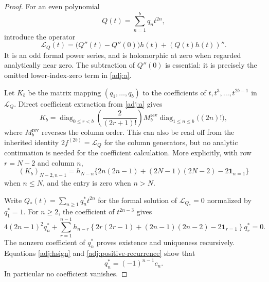 \documentclass[11pt,a4paper]{article}
\numberwithin{equation}{section}
\theoremstyle{definition}
\theoremstyle{remark}
\begin{document}
\begin{proof}
For an even polynomial
\[
 Q(t)=\sum_{n=1}^{b}q_n t^{2n},
\]
introduce the operator
\begin{equation}\label{adj:operator}
 \mathcal L_Q(t)=\bigl(Q''(t)-Q''(0)\bigr)h(t)+(Q(t)h(t))''.
\end{equation}
It is an odd formal power series, and is holomorphic at zero when
regarded analytically near zero.  The subtraction of $Q''(0)$ is
essential: it is precisely the omitted lower-index-zero term in
\eqref{adj:a}.

Let $K_b$ be the matrix mapping $(q_1,\ldots,q_b)$ to the
coefficients of $t,t^3,\ldots,t^{2b-1}$ in $\mathcal L_Q$.
Direct coefficient extraction from \eqref{adj:a} gives
\begin{equation}\label{adj:matrix-conjugacy}
 K_b=\operatorname{diag}_{0\le r<b}\left(\frac2{(2r+1)!}\right)
 M_b^{\mathrm{rev}}
 \operatorname{diag}_{1\le n\le b}\bigl((2n)!\bigr),
\end{equation}
where $M_b^{\mathrm{rev}}$ reverses the column order.  This can
also be read off from the inherited identity
$2f^{(2b)}=\mathcal L_Q$ for the column generators, but no
analytic continuation is needed for the coefficient calculation.
More explicitly, with row $r=N-2$ and column $n$,
\[
 (K_b)_{N-2,n-1}
 =h_{N-n}\{2n(2n-1)+(2N-1)(2N-2)-2\mathbf1_{n=1}\}
\]
when $n\le N$, and the entry is zero when $n>N$.

Write $Q_*(t)=\sum_{n\ge1}q_n^*t^{2n}$ for the formal solution
of $\mathcal L_{Q_*}=0$ normalized by $q_1^*=1$.  For $n\ge2$,
the coefficient of $t^{2n-3}$ gives
\begin{equation}\label{adj:q-recurrence}
 4(2n-1)^2q_n^*
 +\sum_{r=1}^{n-1}h_{n-r}
 \left\{2r(2r-1)+(2n-1)(2n-2)-2\mathbf1_{r=1}\right\}q_r^*=0.
\end{equation}
The nonzero coefficient of $q_n^*$ proves existence and uniqueness
recursively.  Equations \eqref{adj:hsign} and
\eqref{adj:positive-recurrence} show that
\begin{equation}\label{adj:qsign}
 q_n^*=(-1)^{n-1}c_n.
\end{equation}
In particular no coefficient vanishes.


\end{proof}
\end{document}
